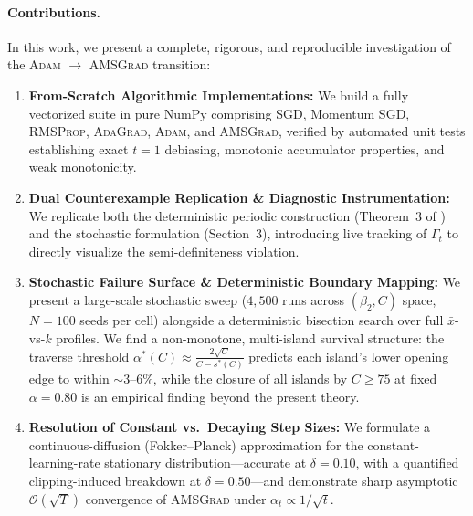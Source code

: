 \paragraph{Contributions.} In this work, we present a complete, rigorous, and reproducible investigation of the \textsc{Adam} $\to$ \textsc{AMSGrad} transition:
\begin{enumerate}
    \item \textbf{From-Scratch Algorithmic Implementations:} We build a fully vectorized suite in pure NumPy comprising \textsc{SGD}, Momentum \textsc{SGD}, \textsc{RMSProp}, \textsc{AdaGrad}, \textsc{Adam}, and \textsc{AMSGrad}, verified by automated unit tests establishing exact $t=1$ debiasing, monotonic accumulator properties, and weak monotonicity.
    \item \textbf{Dual Counterexample Replication \& Diagnostic Instrumentation:} We replicate both the deterministic periodic construction (Theorem~3 of \citet{reddi2018convergence}) and the stochastic formulation (Section~3), introducing live tracking of $\Gamma_t$ to directly visualize the semi-definiteness violation.
    \item \textbf{Stochastic Failure Surface \& Deterministic Boundary Mapping:} We present a large-scale stochastic sweep ($4{,}500$ runs across $(\beta_2, C)$ space, $N = 100$ seeds per cell) alongside a deterministic bisection search over full $\bar{x}$-vs-$k$ profiles. We find a non-monotone, multi-island survival structure: the traverse threshold $\alpha^*(C) \approx \frac{2\sqrt{C}}{C - s^*(C)}$ predicts each island's lower opening edge to within $\sim 3\text{--}6\%$, while the closure of all islands by $C \ge 75$ at fixed $\alpha = 0.80$ is an empirical finding beyond the present theory.
    \item \textbf{Resolution of Constant vs.\ Decaying Step Sizes:} We formulate a continuous-diffusion (Fokker--Planck) approximation for the constant-learning-rate stationary distribution---accurate at $\delta = 0.10$, with a quantified clipping-induced breakdown at $\delta = 0.50$---and demonstrate sharp asymptotic $\mathcal{O}(\sqrt{T})$ convergence of \textsc{AMSGrad} under $\alpha_t \propto 1/\sqrt{t}$.
\end{enumerate}
